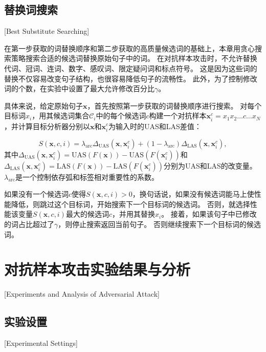 \subsection{替换词搜索}[Best Substitute Searching]

在第一步获取的词替换顺序和第二步获取的高质量候选词的基础上，本章用贪心搜索策略搜索合适的候选词替换原始句子中的词。
在对抗样本攻击时，不允许替换代词、冠词、连词、数字、感叹词、限定疑问词和标点符号。
这是因为这些词的替换不仅容易改变句子结构，也很容易降低句子的流畅性。
此外，为了控制修改词的个数，在实验中设置了最大允许修改百分比$\gamma$。 %

具体来说，给定原始句子$\bm{x}$，首先按照第一步获取的词替换顺序进行搜索。
对每个目标词$x_i$，用其候选词集合$\mathcal{C}_i$中的每个候选词$c$构建一个对抗样本$\bm{x}^c_{i} = x_1x_2\dots c\dots x_N$，并计算目标分析器分别以$\bm{x}$和$\bm{x}^c_{i}$为输入时的UAS和LAS差值：

\begin{equation}
	\label{eq:mis-inc}
	S(\bm{x},c,i) =  \lambda_{\text{arc}}\Delta_\text{UAS}(\bm{x},\bm{x}^c_{i}) +
	 (1-\lambda_{\text{arc}})\Delta_\text{LAS}(\bm{x},\bm{x}^c_{i}),
\end{equation}
其中$\Delta_\text{UAS}(\bm{x},\bm{x}^c_{i}) = \text{UAS}(F(\bm{x})) - \text{UAS}(F(\bm{x}^c_{i})) $和$\Delta_\text{LAS}(\bm{x},\bm{x}^c_{i}) = \text{LAS}(F(\bm{x})) - \text{LAS}(F(\bm{x}^c_{i}))$分别为UAS和LAS的改变量。 
$\lambda_{\text{arc}}$是一个控制依存弧和标签相对重要性的系数。%

如果没有一个候选词$c$使得$S(\bm{x},c,i) > 0$，换句话说，如果没有候选词能马上使性能降低，则跳过这个目标词，开始搜索下一个目标词的候选词。
否则，就选择性能该变量$S(\bm{x},c,i)$最大的候选词$c$，并用其替换$x_i$。
接着，如果该句子中已修改的词占比超过了$\gamma$，则停止搜索返回当前句子。
否则继续搜索下一个目标词的候选词。


\section{对抗样本攻击实验结果与分析}[Experiments and Analysis of Adversarial Attack]

\subsection{实验设置}[Experimental Settings]

